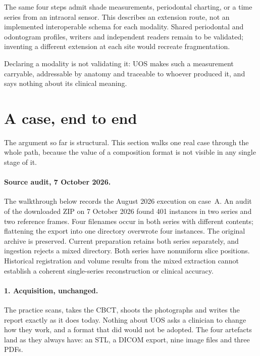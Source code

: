 \documentclass[11pt,a4paper]{article}
\begin{document}
The same four steps admit shade measurements, periodontal charting, or a time series from
an intraoral sensor. This describes an extension route, not an implemented interoperable schema for each modality.
Shared periodontal and odontogram profiles, writers and independent readers remain to be
validated; inventing a different extension at each site would recreate fragmentation.

Declaring a modality is not validating it: UOS makes such a measurement carryable,
addressable by anatomy and traceable to whoever produced it, and says nothing about its
clinical meaning.

\section{A case, end to end}\label{sec:endtoend}

The argument so far is structural. This section walks one real case through the whole path,
because the value of a composition format is not visible in any single stage of it.

\paragraph{Source audit, 7 October 2026.} The walkthrough below records the August 2026
execution on case~A. An audit of the downloaded ZIP on 7 October 2026 found 401 instances in
two series and two reference frames. Four filenames occur in both series with different
contents; flattening the export into one directory overwrote four instances. The original
archive is preserved. Current preparation retains both series separately, and ingestion
rejects a mixed directory. Both series have nonuniform slice positions. Historical
registration and volume results from the mixed extraction cannot establish a coherent
single-series reconstruction or clinical accuracy.

\paragraph{1. Acquisition, unchanged.} The practice scans, takes the CBCT, shoots the
photographs and writes the report exactly as it does today. Nothing about UOS asks a
clinician to change how they work, and a format that did would not be adopted. The four
artefacts land as they always have: an STL, a DICOM export, nine image files and three
PDFs.
\end{document}
